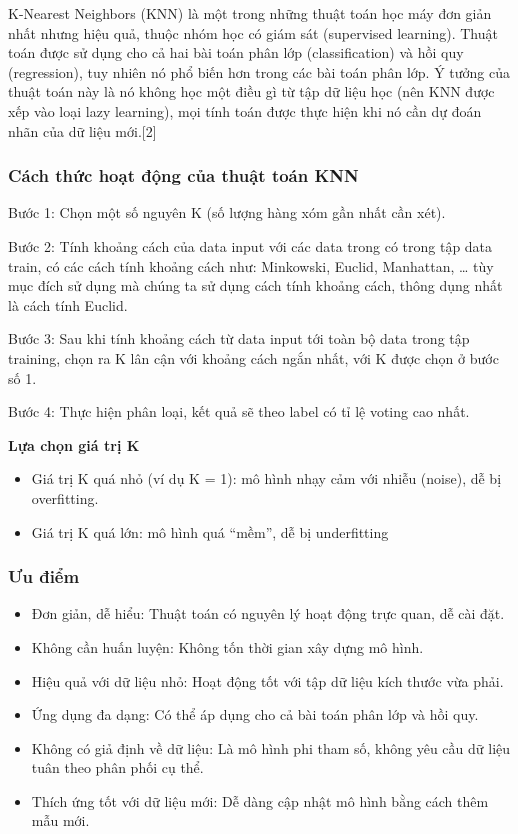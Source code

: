 \documentclass[
]{article}
\begin{document}
K-Nearest Neighbors (KNN) là một trong những thuật toán học máy đơn giản
nhất nhưng hiệu quả, thuộc nhóm học có giám sát (supervised learning).
Thuật toán được sử dụng cho cả hai bài toán phân lớp (classification) và
hồi quy (regression), tuy nhiên nó phổ biến hơn trong các bài toán phân
lớp. Ý tưởng của thuật toán này là nó không học một điều gì từ tập dữ
liệu học (nên KNN được xếp vào loại lazy learning), mọi tính toán được
thực hiện khi nó cần dự đoán nhãn của dữ liệu mới.{[}2{]}

\subsubsection{Cách thức hoạt động của thuật toán
KNN}\label{cuxe1ch-thux1ee9c-houx1ea1t-ux111ux1ed9ng-cux1ee7a-thuux1eadt-touxe1n-knn}

Bước 1: Chọn một số nguyên K (số lượng hàng xóm gần nhất cần xét).

Bước 2: Tính khoảng cách của data input với các data trong có trong tập
data train, có các cách tính khoảng cách như: Minkowski, Euclid,
Manhattan, \ldots{} tùy mục đích sử dụng mà chúng ta sử dụng cách tính
khoảng cách, thông dụng nhất là cách tính Euclid.

Bước 3: Sau khi tính khoảng cách từ data input tới toàn bộ data trong
tập training, chọn ra K lân cận với khoảng cách ngắn nhất, với K được
chọn ở bước số 1.

Bước 4: Thực hiện phân loại, kết quả sẽ theo label có tỉ lệ voting cao
nhất.

\textbf{Lựa chọn giá trị K}

\begin{itemize}
\item
  Giá trị K quá nhỏ (ví dụ K = 1): mô hình nhạy cảm với nhiễu (noise),
  dễ bị overfitting.
\item
  Giá trị K quá lớn: mô hình quá ``mềm'', dễ bị underfitting
\end{itemize}

\subsubsection{Ưu điểm}\label{ux1b0u-ux111iux1ec3m}

\begin{itemize}
\item
  Đơn giản, dễ hiểu: Thuật toán có nguyên lý hoạt động trực quan, dễ cài
  đặt.
\item
  Không cần huấn luyện: Không tốn thời gian xây dựng mô hình.
\item
  Hiệu quả với dữ liệu nhỏ: Hoạt động tốt với tập dữ liệu kích thước vừa
  phải.
\item
  Ứng dụng đa dạng: Có thể áp dụng cho cả bài toán phân lớp và hồi quy.
\item
  Không có giả định về dữ liệu: Là mô hình phi tham số, không yêu cầu dữ
  liệu tuân theo phân phối cụ thể.
\item
  Thích ứng tốt với dữ liệu mới: Dễ dàng cập nhật mô hình bằng cách thêm
  mẫu mới.
\end{itemize}
\end{document}
